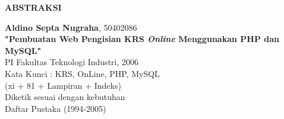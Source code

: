 
%
\newpage %
\begin{center}
\begin{large}\textbf{ABSTRAKSI}\end{large}
\end{center}
\vspace{5mm} \textbf{Aldino Septa Nugraha}, 50402086\\
\textbf{"Pembuatan Web Pengisian KRS \emph{Online} Menggunakan PHP dan MySQL"}
\\
PI Fakultas Teknologi Industri, 2006 \\
Kata Kunci : KRS, OnLine, PHP, MySQL\\
(xi + 81 + Lampiran + Indeks) \\

Diketik sesuai dengan kebutuhan \\
Daftar Pustaka (1994-2005)  %
%